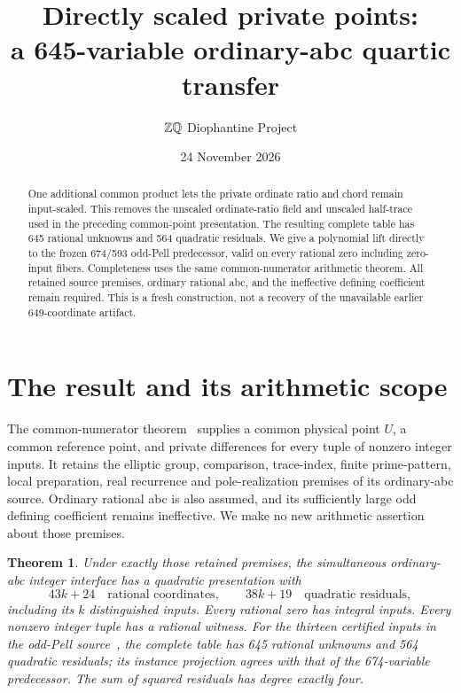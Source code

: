 \documentclass[11pt]{article}
\title{Directly scaled private points:\\a 645-variable ordinary-abc quartic transfer}
\author{\(\mathbb Z\mathbb Q\) Diophantine Project}
\date{24 November 2026}
\newtheorem{theorem}{Theorem}
\begin{document}
\maketitle

\begin{abstract}
One additional common product lets the private ordinate ratio and chord
remain input-scaled. This removes the unscaled ordinate-ratio field and
unscaled half-trace used in the preceding common-point presentation.
The resulting complete table has 645 rational unknowns and 564 quadratic
residuals. We give a polynomial lift directly to the frozen 674/593
odd-Pell predecessor, valid on every rational zero including zero-input
fibers. Completeness uses the same common-numerator arithmetic theorem.
All retained source premises, ordinary rational abc, and the ineffective
defining coefficient remain required. This is a fresh construction,
not a recovery of the unavailable earlier 649-coordinate artifact.
\end{abstract}

\section{The result and its arithmetic scope}

The common-numerator theorem~\cite{common} supplies a common physical
point \(U\), a common reference point, and private differences for every
tuple of nonzero integer inputs. It retains the elliptic group,
comparison, trace-index, finite prime-pattern, local preparation, real
recurrence and pole-realization premises of its ordinary-abc source.
Ordinary rational abc is also assumed, and its sufficiently large odd
defining coefficient remains ineffective. We make no new arithmetic
assertion about those premises.

\begin{theorem}\label{thm:main}
Under exactly those retained premises, the simultaneous ordinary-abc
integer interface has a quadratic presentation with
\[
        43k+24\quad\text{rational coordinates},\qquad
        38k+19\quad\text{quadratic residuals},
\]
including its \(k\) distinguished inputs. Every rational zero has
integral inputs. Every nonzero integer tuple has a rational witness.
For the thirteen certified inputs in the odd-Pell source~\cite{odd},
the complete table has 645 rational unknowns and 564 quadratic residuals;
its instance projection agrees with that of the 674-variable predecessor.
The sum of squared residuals has degree exactly four.
\end{theorem}
\end{document}
